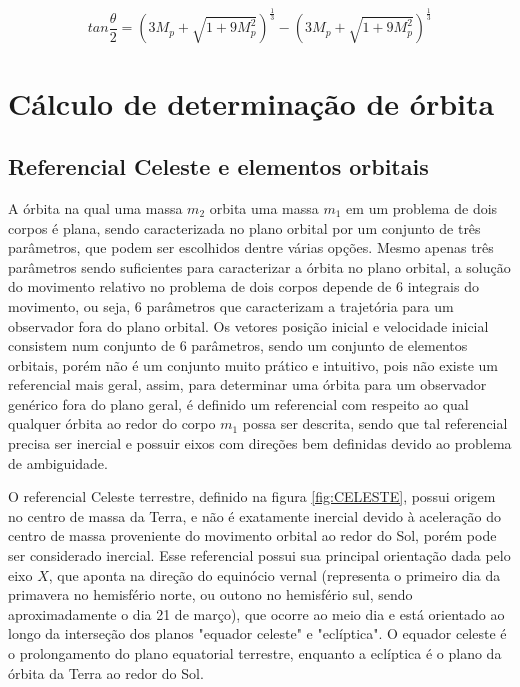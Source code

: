 \begin{equation}
    tan\frac{\theta}{2} = \left( 3M_{p} + \sqrt{1+9M_{p}^{2}}     \right)^{\frac{1}{3}}-\left( 3M_{p} + \sqrt{1+9M_{p}^{2} }    \right)^{\frac{1}{3}}
    \label{eq:81}
\end{equation}

\section{Cálculo de determinação de órbita}

\subsection{Referencial Celeste e elementos orbitais}
A órbita na qual uma massa $m_{2}$ orbita uma massa $m_{1}$ em um problema de dois corpos é plana, sendo caracterizada no plano orbital por um conjunto de três parâmetros, que podem ser escolhidos dentre várias opções. Mesmo apenas três parâmetros sendo suficientes para caracterizar a órbita no plano orbital, a solução do movimento relativo no problema de dois corpos depende de 6 integrais do movimento, ou seja, 6 parâmetros que caracterizam a trajetória para um observador fora do plano orbital. Os vetores posição inicial e velocidade inicial consistem num conjunto de 6 parâmetros, sendo um conjunto de elementos orbitais, porém não é um conjunto muito prático e intuitivo, pois não existe um referencial mais geral, assim, para determinar uma órbita para um observador genérico fora do plano geral, é definido um referencial com respeito ao qual qualquer órbita ao redor do corpo $m_{1}$ possa ser descrita, sendo que tal referencial precisa ser inercial e possuir eixos com direções bem definidas devido ao problema de ambiguidade.

O referencial Celeste terrestre, definido na figura \ref{fig:CELESTE}, possui origem no centro de massa da Terra, e não é exatamente inercial devido à aceleração do centro de massa proveniente do movimento orbital ao redor do Sol, porém pode ser considerado inercial. Esse referencial possui sua principal orientação dada pelo eixo $X$, que aponta na direção do equinócio vernal (representa o primeiro dia da primavera no hemisfério norte, ou outono no hemisfério sul, sendo aproximadamente o dia 21 de março), que ocorre ao meio dia e está orientado ao longo da interseção dos planos "equador celeste" e "eclíptica". O equador celeste é o prolongamento do plano equatorial terrestre, enquanto a eclíptica é o plano da órbita da Terra ao redor do Sol.

